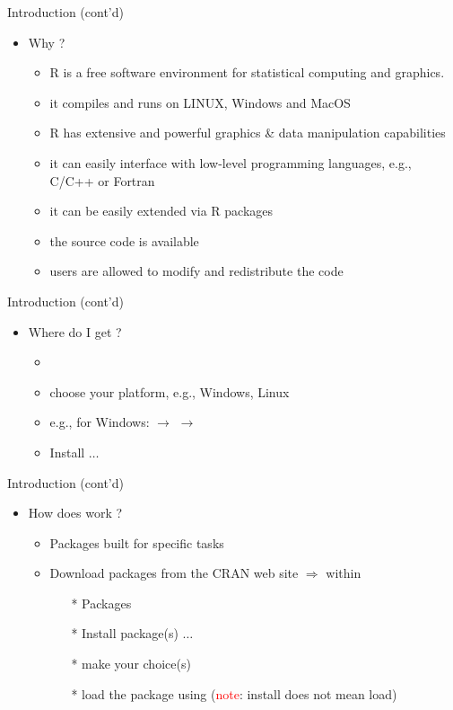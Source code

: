 \documentclass[14pt, aspectratio=169, sectionpage=simple, xclolor=table]{beamer}
\begin{document}
\begin{frame}[fragile]{ Introduction (cont'd)}
\begin{itemize}
	\item Why \R ?
	\begin{itemize}
		\item R is a free software environment for statistical
		computing and graphics.
		\item it compiles and runs on LINUX, Windows and MacOS
		\item R has extensive and powerful graphics \& data manipulation
		capabilities
		\item it can easily interface with low-level programming
		languages, e.g., C/C++ or Fortran
		\item it can be easily extended via R packages
		\item the source code is available
		\item users are allowed to modify and redistribute the code
	\end{itemize}
\end{itemize}
\end{frame}
\begin{frame}[fragile]{ Introduction (cont'd)}
\begin{itemize}
	\item Where do I get \R ?
	\begin{itemize}
		\item {}
		\item choose your platform, e.g., Windows, Linux
		\item e.g., for Windows:  $\rightarrow$ 
		$\rightarrow$ 
		\item Install $\ldots$
		\nl
	\end{itemize}
\end{itemize}
\end{frame}
\begin{frame}[fragile]{ Introduction (cont'd)}
\begin{itemize}
	\item How does \R work ?
	\begin{itemize}
		\item Packages built for specific tasks
		\item Download \R packages from the CRAN web site $\Rightarrow$ within \R
		\begin{itemize}
			\item[*] Packages
			\item[*] Install package(s) $\ldots$
			\item[*] make your choice(s)
			\item[*] load the package using  (\textcolor{red}{note}:
			install does not mean load)
		\end{itemize}
	\end{itemize}
\end{itemize}
\end{frame}
\end{document}
